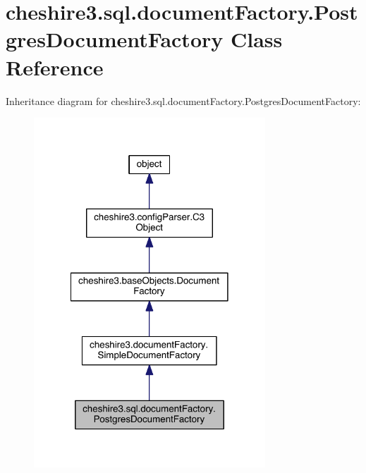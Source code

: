 \hypertarget{classcheshire3_1_1sql_1_1document_factory_1_1_postgres_document_factory}{\section{cheshire3.\-sql.\-document\-Factory.\-Postgres\-Document\-Factory Class Reference}
\label{classcheshire3_1_1sql_1_1document_factory_1_1_postgres_document_factory}
}


Inheritance diagram for cheshire3.\-sql.\-document\-Factory.\-Postgres\-Document\-Factory\-:
\nopagebreak
\begin{figure}[H]
\begin{center}
\leavevmode
\includegraphics[width=246pt]{classcheshire3_1_1sql_1_1document_factory_1_1_postgres_document_factory__inherit__graph}
\end{center}
\end{figure}


